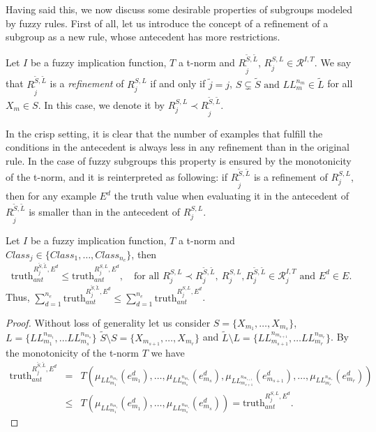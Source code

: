 Having said this, we now discuss some desirable properties of subgroups modeled by fuzzy rules. First of all, let us introduce the concept of a refinement of a subgroup as a new rule, whose antecedent has more restrictions.

\begin{definition}\label{def:SDrefinements}
	Let $I$ be a fuzzy implication function, $T$ a t-norm and $R^{\tilde{S},\tilde{L}}_{\tilde{j}}$, $R^{S,L}_j \in \mathcal{R}^{I,T}$. We say that $R^{\tilde{S},\tilde{L}}_{\tilde{j}}$ is a \emph{refinement} of $R^{S,L}_j$ if and only if $\tilde{j}=j$, $ S \subsetneq \tilde{S} \text{ and } LL_{m}^{n_{m}} \in \tilde{L}$ for all $X_{m} \in S$. In this case, we denote it by $R^{S,L}_j \prec R^{\tilde{S},\tilde{L}}_{\tilde{j}}$.
\end{definition}

In the crisp setting, it is clear that the number of examples that fulfill the conditions in the antecedent is always less in any refinement than in the original rule. In the case of fuzzy subgroups this property is ensured by the monotonicity of the t-norm, and it is reinterpreted as following: if $R^{\tilde{S},\tilde{L}}_{\tilde{j}}$ is a refinement of $R^{S,L}_j$, then for any example $E^d$ the truth value when evaluating it in the antecedent of $R^{\tilde{S},\tilde{L}}_{\tilde{j}}$ is smaller than in the antecedent of $R^{S,L}_j$.

\begin{proposition}\label{prop:SD:MonotonicityANT} 
Let $I$ be a fuzzy implication function, $T$ a t-norm and $Class_j \in \{Class_1,\dots,Class_{n_c}\}$, then
	$$ \text{truth}_{ant}^{R^{\tilde{S},\tilde{L}}_{j},E^d} \leq \text{truth}_{ant}^{R^{S,L}_j,E^d}, \quad \text{for all }  R^{S,L}_j \prec R^{\tilde{S},\tilde{L}}_{j},~ R^{S,L}_j,R^{\tilde{S},\tilde{L}}_{j}  \in \mathcal{R}^{I,T}_j \text{ and } E^d \in E.
	$$
Thus, $\displaystyle \sum_{d=1}^{n_e}\text{truth}_{ant}^{R^{\tilde{S},\tilde{L}}_{j},E^d} \leq \sum_{d=1}^{n_e} \text{truth}_{ant}^{R^{S,L}_j,E^d}$.
\end{proposition}

\begin{proof} Without loss of generality let us consider $S= \{X_{m_1},\dots,X_{m_s}\}$, $L = \{LL_{m_{1}}^{n_{m_{1}}}, \dots LL_{m_{s}}^{n_{m_{s}}} \}$   $\tilde{S}\setminus S = \{X_{m_{s+1}},\dots,X_{m_r}\}$ and $\tilde{L} \setminus L = \{LL_{m_{s+1}}^{n_{m_{s+1}}}, \dots LL_{m_{r}}^{n_{m_{r}}} \}$. By the monotonicity of the t-norm $T$ we have
\begin{eqnarray*}
	\text{truth}_{ant}^{R^{\tilde{S},\tilde{L}}_{j},E^d} &=& T\left(\mu_{LL_{m_1}^{n_{m_1}}}(e_{m_1}^d), \dots, \mu_{LL_{m_s}^{n_{m_s}}}(e_{m_s}^d), \mu_{LL_{m_{s+1}}^{n_{m_{s+1}}}}(e_{m_{s+1}}^d), \dots, \mu_{LL_{m_r}^{n_{m_r}}}(e_{m_r}^d) \right) \\
		&\leq&   T\left(\mu_{LL_{m_1}^{n_{m_1}}}(e_{m_1}^d), \dots, \mu_{LL_{m_s}^{n_{m_s}}}(e_{m_s}^d)  \right) = \text{truth}_{ant}^{R^{S,L}_j,E^d}.
\end{eqnarray*}	
\end{proof}

